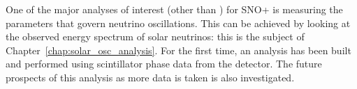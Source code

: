 One of the major analyses of interest (other than \onbb{}) for SNO+ is measuring the parameters that govern neutrino oscillations. This can be achieved by looking at the observed energy spectrum of \beight{} solar neutrinos: this is the subject of Chapter~\ref{chap:solar_osc_analysis}. For the first time, an analysis has been built and performed using scintillator phase data from the detector. The future prospects of this analysis as more data is taken is also investigated.